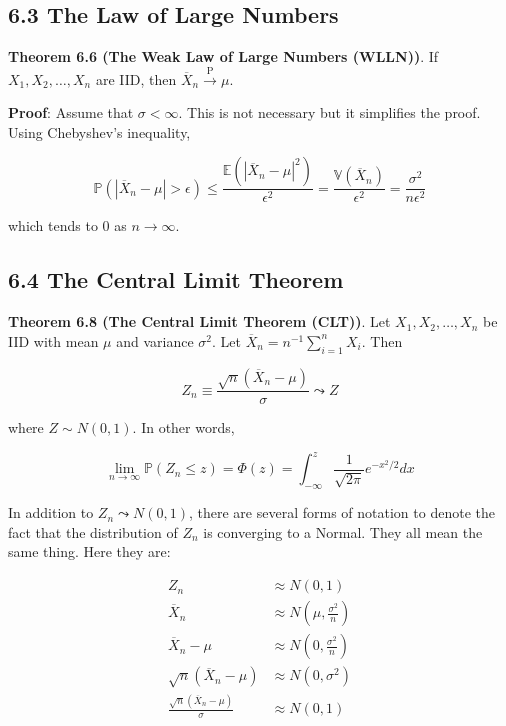 \subsection{6.3 The Law of Large
Numbers}\label{the-law-of-large-numbers}

\textbf{Theorem 6.6 (The Weak Law of Large Numbers (WLLN))}. If
\(X_1, X_2, \dots, X_n\) are IID, then
\(\overline{X}_n \xrightarrow{\text{P}} \mu\).

\textbf{Proof}: Assume that \(\sigma < \infty\). This is not necessary
but it simplifies the proof. Using Chebyshev's inequality,

\[ \mathbb{P}(|\overline{X}_n - \mu| > \epsilon) \leq \frac{\mathbb{E}(|\overline{X}_n - \mu|^2)}{\epsilon^2} = \frac{\mathbb{V}(\overline{X}_n)}{\epsilon^2} = \frac{\sigma^2}{n \epsilon^2} \]

which tends to 0 as \(n \rightarrow \infty\).

\subsection{6.4 The Central Limit
Theorem}\label{the-central-limit-theorem}

\textbf{Theorem 6.8 (The Central Limit Theorem (CLT))}. Let
\(X_1, X_2, \dots, X_n\) be IID with mean \(\mu\) and variance
\(\sigma^2\). Let \(\overline{X}_n = n^{-1}\sum_{i=1}^n X_i\). Then

\[ Z_n \equiv \frac{\sqrt{n} \left( \overline{X}_n - \mu \right)}{\sigma} \leadsto Z \]

where \(Z \sim N(0, 1)\). In other words,

\[ \lim _{n \rightarrow \infty} \mathbb{P}(Z_n \leq z) = \Phi(z) = \int _{-\infty} ^z \frac{1}{\sqrt{2 \pi}} e^{-x^2/2}dx\]

In addition to \(Z_n \leadsto N(0, 1)\), there are several forms of
notation to denote the fact that the distribution of \(Z_n\) is
converging to a Normal. They all mean the same thing. Here they are:

\begin{align}
Z_n                                           & \approx N(0, 1) \\
\overline{X}_n                                & \approx N\left( \mu, \frac{\sigma^2}{n} \right)  \\
\overline{X}_n - \mu                          & \approx N\left( 0,   \frac{\sigma^2}{n} \right)  \\
\sqrt{n}(\overline{X}_n - \mu)                & \approx N\left( 0, \sigma^2 \right)              \\
\frac{\sqrt{n}(\overline{X}_n - \mu)}{\sigma} & \approx N(0, 1)
\end{align}

